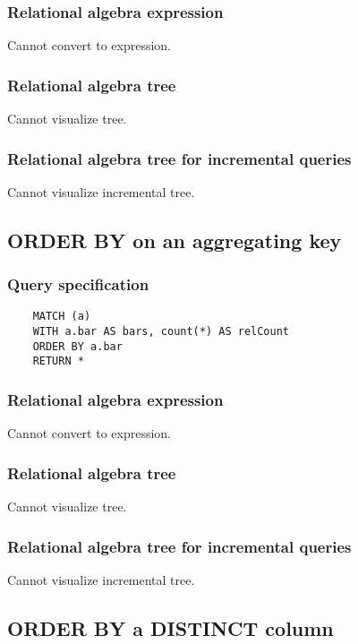 	\subsubsection*{Relational algebra expression}

	Cannot convert to expression.

	\subsubsection*{Relational algebra tree}

	Cannot visualize tree.

	\subsubsection*{Relational algebra tree for incremental queries}

	Cannot visualize incremental tree.
	\subsection{ORDER BY on an aggregating key}

	\subsubsection*{Query specification}

	\begin{lstlisting}
	MATCH (a)
	WITH a.bar AS bars, count(*) AS relCount
	ORDER BY a.bar
	RETURN *
	\end{lstlisting}


	\subsubsection*{Relational algebra expression}

	Cannot convert to expression.

	\subsubsection*{Relational algebra tree}

	Cannot visualize tree.

	\subsubsection*{Relational algebra tree for incremental queries}

	Cannot visualize incremental tree.
	\subsection{ORDER BY a DISTINCT column}

